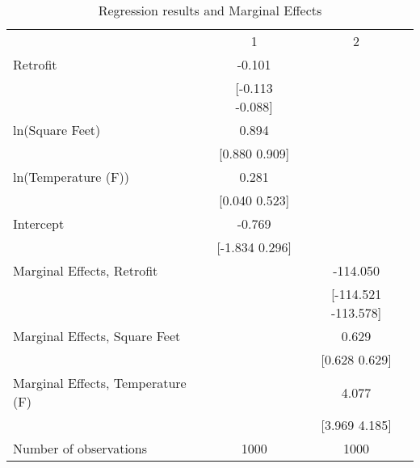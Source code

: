 
\begin{table}[!h]
\caption{Regression results and Marginal Effects}
\centering
\begin{tabular}{lll}
\cline{1-3}
\multicolumn{1}{r}{} &
  \multicolumn{1}{c}{1} &
  \multicolumn{1}{c}{2} \\
\cline{1-3}
\multicolumn{1}{l}{Retrofit} &
  \multicolumn{1}{c}{-0.101} &
  \multicolumn{1}{c}{} \\
\multicolumn{1}{l}{} &
  \multicolumn{1}{c}{[-0.113    -0.088]} &
  \multicolumn{1}{c}{} \\
\multicolumn{1}{l}{ln(Square Feet)} &
  \multicolumn{1}{c}{0.894} &
  \multicolumn{1}{c}{} \\
\multicolumn{1}{l}{} &
  \multicolumn{1}{c}{[0.880     0.909]} &
  \multicolumn{1}{c}{} \\
\multicolumn{1}{l}{ln(Temperature (F))} &
  \multicolumn{1}{c}{0.281} &
  \multicolumn{1}{c}{} \\
\multicolumn{1}{l}{} &
  \multicolumn{1}{c}{[0.040     0.523]} &
  \multicolumn{1}{c}{} \\
\multicolumn{1}{l}{Intercept} &
  \multicolumn{1}{c}{-0.769} &
  \multicolumn{1}{c}{} \\
\multicolumn{1}{l}{} &
  \multicolumn{1}{c}{[-1.834     0.296]} &
  \multicolumn{1}{c}{} \\
\multicolumn{1}{l}{Marginal Effects, Retrofit} &
  \multicolumn{1}{c}{} &
  \multicolumn{1}{c}{-114.050} \\
\multicolumn{1}{l}{} &
  \multicolumn{1}{c}{} &
  \multicolumn{1}{c}{[-114.521  -113.578]} \\
\multicolumn{1}{l}{Marginal Effects, Square Feet} &
  \multicolumn{1}{c}{} &
  \multicolumn{1}{c}{0.629} \\
\multicolumn{1}{l}{} &
  \multicolumn{1}{c}{} &
  \multicolumn{1}{c}{[0.628     0.629]} \\
\multicolumn{1}{l}{Marginal Effects, Temperature (F)} &
  \multicolumn{1}{c}{} &
  \multicolumn{1}{c}{4.077} \\
\multicolumn{1}{l}{} &
  \multicolumn{1}{c}{} &
  \multicolumn{1}{c}{[3.969     4.185]} \\
\multicolumn{1}{l}{Number of observations} &
  \multicolumn{1}{c}{1000} &
  \multicolumn{1}{c}{1000} \\
\cline{1-3}
\end{tabular}
\end{table}

